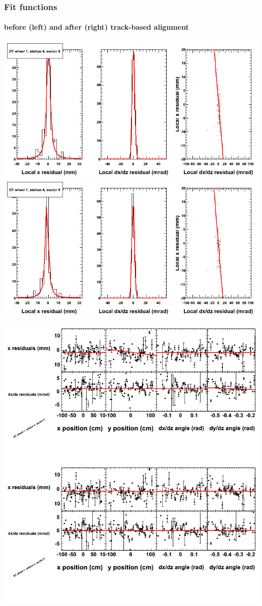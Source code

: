 \documentclass[compress]{beamer}
\begin{document}
\begin{frame}
\frametitle{Fit functions}
\framesubtitle{before (left) and after (right) track-based alignment}
\includegraphics[width=0.5\linewidth]{fitfunctions_re01/MBwhDst4sec09_bellcurves.png} \includegraphics[width=0.5\linewidth]{fitfunctions_re05/MBwhDst4sec09_bellcurves.png}

\includegraphics[width=0.5\linewidth]{fitfunctions_re01/MBwhDst4sec09_polynomials.png} \includegraphics[width=0.5\linewidth]{fitfunctions_re05/MBwhDst4sec09_polynomials.png}
\end{frame}
\end{document}
